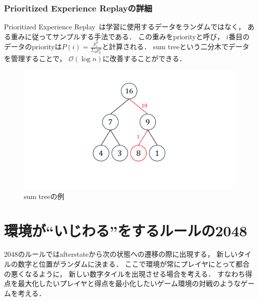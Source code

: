 \subsection{Prioritized Experience Replayの詳細}
Prioritized Experience Replay~\cite{prioritized}は学習に使用するデータをランダムではなく， ある重みに従ってサンプルする手法である．
この重みをpriorityと呼び， $i$番目のデータのpriorityは$P(i) = \frac{p_{i}^{\alpha}}{\Sigma_k p_{k}^{\alpha}}$と計算される．
sum treeという二分木でデータを管理することで， $\mathcal{O}(\log n)$に改善することができる．
\begin{figure}[t]
    \centering
    \includegraphics[width=0.6\linewidth{}]{figures/sumtree.pdf}
    \caption{sum treeの例}
    \label{fig:sumtree}
\end{figure}

\chapter{環境が“いじわる”をするルールの2048}
2048のルールではafterstateから次の状態への遷移の際に出現する， 新しいタイルの数字と位置がランダムに決まる．
ここで環境が常にプレイヤにとって都合の悪くなるように， 新しい数字タイルを出現させる場合を考える．
すなわち得点を最大化したいプレイヤと得点を最小化したいゲーム環境の対戦のようなゲームを考える．
